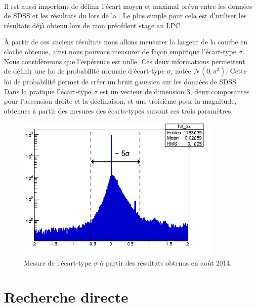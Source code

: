 
\ 

Il est aussi important de définir l'écart moyen et maximal prévu entre les données de SDSS et les résultats du \stack{} lors de la \DC{}. Le plus simple pour cela est d'utiliser les résultats déjà obtenu lors de mon précédent stage au LPC.

À partir de ces anciens résultats nous allons meusurer la largeur de la courbe en cloche obtenue, ainsi nous pouvons meusurer de façon empirique l'écart-type $\sigma$. Nous considèrerons que l'espérence est nulle. Ces deux informations permettent de définir une loi de probabilité normale d'écart-type $\sigma$, notée $\mathcal{N}(0,\sigma^{2})$. Cette loi de probabilité permet de créer un bruit gaussien sur les données de SDSS. Dans la pratique l'écart-type $\sigma$ est un vecteur de dimension 3, deux composantes pour l'ascension droite et la déclinaison, et une troisième pour la magnitude, obtenues à partir des mesures des écarts-types suivant ces trois paramètres.

	\begin{figure}[h]
		\centering
		\includegraphics[width=0.9\textwidth]{img/mesuresigma.png}
		\caption[Mesure de l'écart-type à partir des anciens résultats]{Mesure de l'écart-type $\sigma$ à partir des résultats obtenus en août 2014.}
		\label{fig:mesuresigma}
	\end{figure}


\section{Recherche directe}

